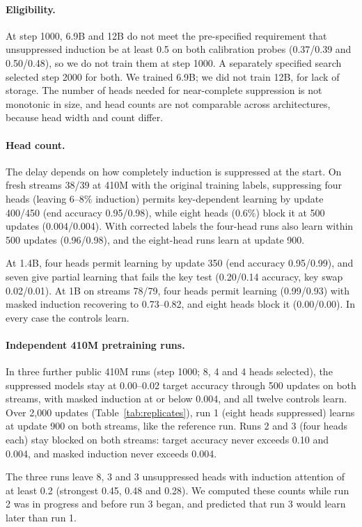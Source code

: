 \paragraph{Eligibility.}
At step 1000, 6.9B and 12B do not meet the pre-specified requirement that
unsuppressed induction be at least 0.5 on both calibration probes (0.37/0.39 and
0.50/0.48), so we do not train them at step 1000. A separately specified search
selected step 2000 for both. We trained 6.9B; we did not train 12B, for lack of
storage. The number of heads needed for near-complete suppression is not monotonic
in size, and head counts are not comparable across architectures, because head
width and count differ.

\paragraph{Head count.}
The delay depends on how completely induction is suppressed at the start. On fresh
streams 38/39 at 410M with the original training labels, suppressing four heads
(leaving 6--8\% induction) permits key-dependent learning by update 400/450 (end
accuracy 0.95/0.98), while eight heads (0.6\%) block it at 500 updates
(0.004/0.004). With corrected labels the four-head runs also learn within 500
updates (0.96/0.98), and the eight-head runs learn at update 900.

At 1.4B, four heads permit learning by update 350 (end accuracy 0.95/0.99), and
seven give partial learning that fails the key test (0.20/0.14 accuracy, key swap
0.02/0.01). At 1B on streams 78/79, four heads permit learning (0.99/0.93) with
masked induction recovering to 0.73--0.82, and eight heads block it (0.00/0.00). In
every case the controls learn.

\paragraph{Independent 410M pretraining runs.}
In three further public 410M runs (step 1000; 8, 4 and 4 heads selected), the
suppressed models stay at 0.00--0.02 target accuracy through 500 updates on both
streams, with masked induction at or below 0.004, and all twelve controls learn.
Over 2,000 updates (Table~\ref{tab:replicates}), run 1 (eight heads suppressed)
learns at update 900 on both streams, like the reference run. Runs 2 and 3 (four
heads each) stay blocked on both streams: target accuracy never exceeds 0.10 and
0.004, and masked induction never exceeds 0.004.

The three runs leave 8, 3 and 3 unsuppressed heads with induction attention of at
least 0.2 (strongest 0.45, 0.48 and 0.28). We computed these counts while run 2 was
in progress and before run 3 began, and predicted that run 3 would learn later than
run 1.

